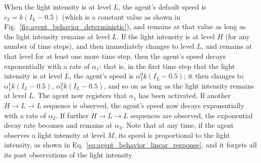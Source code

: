 When the light intensity is at level $L$, the agent's default speed is $c_2 = k\left(I_L - 0.5\right)$ (which is a constant value as shown in Fig.~\ref{fig:agent_behavior_deterministic}), and remains at that value as long as the light intensity remains at level $L$. If the light intensity is at level $H$ (for any number of time steps), and then immediately changes to level $L$, and remains at that level for at least one more time step, then the agent's speed decays exponentially with a rate of $\alpha_1$: that is, in the first time step that the light intensity is at level $L$, the agent's speed is $\alpha_1^{0}k\left(I_L-0.5\right)$; it then changes to $\alpha_1^{1} k \left(I_L-0.5\right)$, $\alpha_1^{2} k \left(I_L-0.5\right)$, and so on as long as the light intensity remains at level $L$. The agent now registers that $\alpha_1$ has been activated. If another $H\rightarrow L\rightarrow L$ sequence is observed, the agent's speed now decays exponentially with a rate of $\alpha_2$. If further $H\rightarrow L\rightarrow L$ sequences are observed, the exponential decay rate becomes and remains at $\alpha_3$. Note that at any time, if the agent observes a light intensity at level $M$, its speed is proportional to the light intensity, as shown in Eq.~\ref{eq:agent_behavior_linear_response}, and it forgets all its past observations of the light intensity. 



